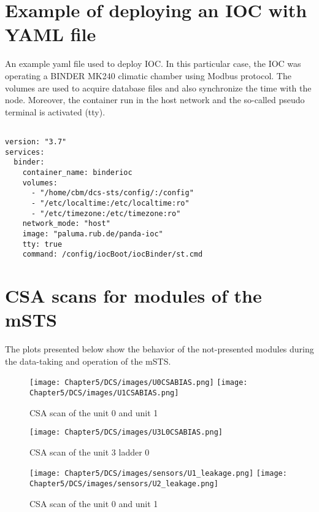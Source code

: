 \newpage
\appendix

\chapter{Example of deploying an IOC with YAML file}
An example yaml file used to deploy \gls{IOC}. In this particular case, the IOC was operating a BINDER MK240 climatic chamber using Modbus protocol. The volumes are used to acquire database files and also synchronize the time with the node. Moreover, the container run in the host network and the so-called pseudo terminal is activated (tty). 
\label{YAML}
  \begin{verbatim}
  
version: "3.7"
services:
  binder:
    container_name: binderioc
    volumes:
      - "/home/cbm/dcs-sts/config/:/config"
      - "/etc/localtime:/etc/localtime:ro"
      - "/etc/timezone:/etc/timezone:ro"
    network_mode: "host"
    image: "paluma.rub.de/panda-ioc"
    tty: true
    command: /config/iocBoot/iocBinder/st.cmd

\end{verbatim}

\chapter{CSA scans for modules of the mSTS}
\label{CSA}
The plots presented below show the behavior of the not-presented modules during the data-taking and operation of the mSTS. 

\begin{figure}[h!]
\centering
\texttt{[image: Chapter5/DCS/images/U0CSABIAS.png]}
\texttt{[image: Chapter5/DCS/images/U1CSABIAS.png]}
\caption{CSA scan of the unit 0 and unit 1 }
\label{U0CSABIAS}
\end{figure}

\begin{figure}[h!]
\centering
\texttt{[image: Chapter5/DCS/images/U3L0CSABIAS.png]}
\caption{CSA scan of the unit 3 ladder 0}
\label{U3L0CSABIAS}
\end{figure}


\begin{figure}[h!]
\centering
\texttt{[image: Chapter5/DCS/images/sensors/U1\_leakage.png]}
\texttt{[image: Chapter5/DCS/images/sensors/U2\_leakage.png]}
\caption{CSA scan of the unit 0 and unit 1 }
\label{U0CSABIAS}
\end{figure}

